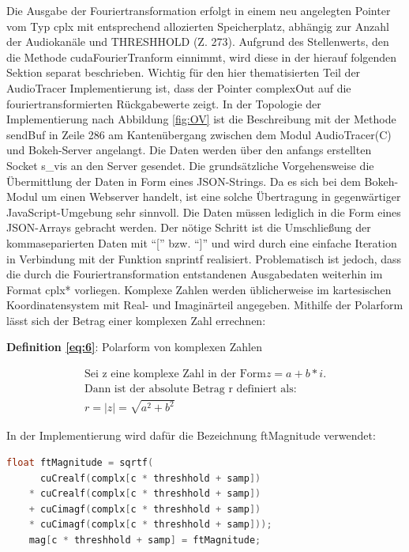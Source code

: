 Die Ausgabe der Fouriertransformation erfolgt in einem neu angelegten Pointer vom Typ cplx mit entsprechend allozierten Speicherplatz, abhängig zur Anzahl der Audiokanäle und THRESHHOLD (Z. 273). Aufgrund des Stellenwerts, den die Methode cudaFourierTranform einnimmt, wird diese in der hierauf folgenden Sektion separat beschrieben. Wichtig für den hier thematisierten Teil der AudioTracer Implementierung ist, dass der Pointer complexOut auf die fouriertransformierten Rückgabewerte zeigt. In der Topologie der Implementierung nach Abbildung \ref{fig:OV} ist die Beschreibung mit der Methode sendBuf in Zeile 286 am Kantenübergang zwischen dem Modul AudioTracer(C) und Bokeh-Server angelangt. Die Daten werden über den anfangs erstellten Socket s\_vis an den Server gesendet. Die grundsätzliche Vorgehensweise die Übermittlung der Daten in Form eines JSON-Strings. Da es sich bei dem Bokeh-Modul um einen Webserver handelt, ist eine solche Übertragung in gegenwärtiger JavaScript-Umgebung sehr sinnvoll. Die Daten müssen lediglich in die Form eines JSON-Arrays gebracht werden. Der nötige Schritt ist die Umschließung der kommaseparierten Daten mit \enquote{[} bzw. \enquote{]} und wird durch eine einfache Iteration in Verbindung mit der Funktion snprintf realisiert. Problematisch ist jedoch, dass die durch die Fouriertransformation entstandenen Ausgabedaten weiterhin im Format cplx* vorliegen. Komplexe Zahlen werden üblicherweise im kartesischen Koordinatensystem mit Real- und Imaginärteil angegeben. Mithilfe der Polarform lässt sich der Betrag einer komplexen Zahl errechnen:
\newpage
\begin{flushleft}
	\textbf{Definition \eqref{eq:6}}: Polarform von komplexen Zahlen
\end{flushleft}
\vspace{\baselineskip}
\begin{equation}
	\begin{gathered}
		\text{Sei z eine komplexe Zahl in der Form} z = a + b * i. \\
		\text{Dann ist der absolute Betrag r definiert als:} \\
				r = |z| = \sqrt{a^{2} + b^{2}}
	\end{gathered}\label{eq:6}
\end{equation}

In der Implementierung wird dafür die Bezeichnung ftMagnitude verwendet:

\begin{lstlisting}[language=C, frame=none]
	float ftMagnitude = sqrtf(
	  cuCrealf(complx[c * threshhold + samp]) 
	* cuCrealf(complx[c * threshhold + samp]) 
	+ cuCimagf(complx[c * threshhold + samp]) 
	* cuCimagf(complx[c * threshhold + samp]));
	mag[c * threshhold + samp] = ftMagnitude;
\end{lstlisting}

